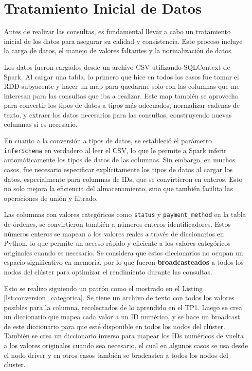 \section{Tratamiento Inicial de Datos}
\label{sec:tratamiento_inicial_de_datos}

Antes de realizar las consultas, es fundamental llevar a cabo un tratamiento inicial de los datos para asegurar su calidad y consistencia. Este proceso incluye la carga de datos, el manejo de valores faltantes y la normalización de datos.

Los datos fueron cargados desde un archivo CSV utilizando SQLContext de Spark. Al cargar una tabla, lo primero que hice en todos los casos fue tomar el RDD subyacente y hacer un map para quedarme solo con las columnas que me interesan para las consultas que iba a realizar. Este map también se aprovecha para convertir los tipos de datos a tipos más adecuados, normalizar cadenas de texto, y extraer los datos necesarios para las consultas, construyendo nuevas columnas si es necesario.

En cuanto a la conversión a tipos de datos, se estableció el parámetro \texttt{inferSchema} en verdadero al leer el CSV, lo que le permite a Spark inferir automáticamente los tipos de datos de las columnas. Sin embargo, en muchos casos, fue necesario especificar explícitamente los tipos de datos al cargar los datos, especialmente para columnas de IDs, que se convirtieron en enteros. Esto no solo mejora la eficiencia del almacenamiento, sino que también facilita las operaciones de unión y filtrado. 

Las columnas con valores categóricos como \texttt{status} y \texttt{payment\_method} en la tabla de órdenes, se convirtieron también a números enteros identificadores. Estos números enteros se mapean a los valores reales a través de diccionarios en Python, lo que permite un acceso rápido y eficiente a los valores categóricos originales cuando es necesario. Se considera que estos diccionarios no ocupan un espacio significativo en memoria, por lo que fueron \textbf{broadcasteados} a todos los nodos del clúster para optimizar el rendimiento durante las consultas. 

Esto se realizo siguiendo un patrón como el mostrado en el Listing \ref{lst:conversion_categorica}. Se tiene un archivo de texto con todos los valores posibles para la columna, recolectados de lo aprendido en el TP1. Luego se crea un diccionario que mapea cada valor a un ID numérico, y se hace un broadcast de este diccionario para que esté disponible en todos los nodos del clúster. También se crea un diccionario inverso para mapear los IDs numéricos de vuelta a los valores originales cuando sea necesario, el cual en algunos casos se usa desde el nodo driver y en otros casos también se bradcastea a todos los nodos del cluster.

